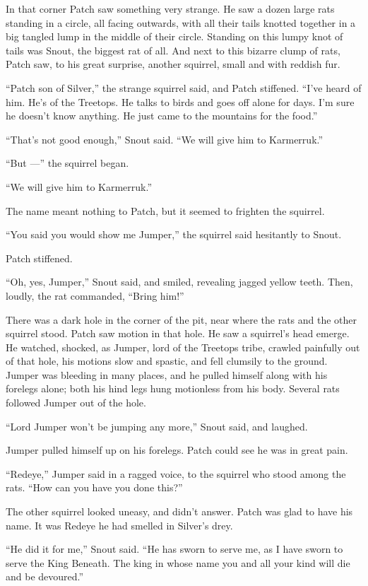 \documentclass[ebook,oneside,openany,12pt]{memoir}
\begin{document}
In that corner Patch saw something very strange. He saw a dozen large
rats standing in a circle, all facing outwards, with all their tails
knotted together in a big tangled lump in the middle of their
circle. Standing on this lumpy knot of tails was Snout, the biggest
rat of all. And next to this bizarre clump of rats, Patch saw, to his
great surprise, another squirrel, small and with reddish fur.

“Patch son of Silver,” the strange squirrel said, and Patch
stiffened. “I’ve heard of him. He’s of the Treetops. He talks to birds
and goes off alone for days. I’m sure he doesn’t know anything. He
just came to the mountains for the food.”

“That’s not good enough,” Snout said. “We will give him to Karmerruk.”

“But —” the squirrel began.

“We will give him to Karmerruk.”

The name meant nothing to Patch, but it seemed to frighten the
squirrel.

“You said you would show me Jumper,” the squirrel said hesitantly to
Snout.

Patch stiffened.

“Oh, yes, Jumper,” Snout said, and smiled, revealing jagged yellow
teeth. Then, loudly, the rat commanded, “Bring him!”

There was a dark hole in the corner of the pit, near where the rats
and the other squirrel stood. Patch saw motion in that hole. He saw a
squirrel’s head emerge. He watched, shocked, as Jumper, lord of the
Treetops tribe, crawled painfully out of that hole, his motions slow
and spastic, and fell clumsily to the ground. Jumper was bleeding in
many places, and he pulled himself along with his forelegs alone; both
his hind legs hung motionless from his body. Several rats followed
Jumper out of the hole.

“Lord Jumper won’t be jumping any more,” Snout said, and laughed.

Jumper pulled himself up on his forelegs. Patch could see he was in
great pain.

“Redeye,” Jumper said in a ragged voice, to the squirrel who stood
among the rats. “How can you have you done this?”

The other squirrel looked uneasy, and didn’t answer. Patch was glad to
have his name. It was Redeye he had smelled in Silver’s drey.

“He did it for me,” Snout said. “He has sworn to serve me, as I have
sworn to serve the King Beneath. The king in whose name you and all
your kind will die and be devoured.”
\end{document}
